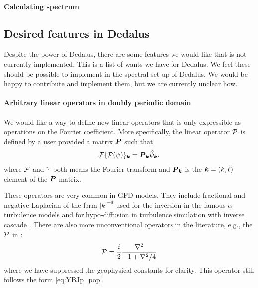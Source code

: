 \paragraph{Calculating spectrum}

\subsection{Desired features in Dedalus}
Despite the power of Dedalus, there are some features we would like that is not currently implemented. This is a list of wants we have for Dedalus. We feel these should be possible to implement in the spectral set-up of Dedalus. We would be happy to contribute and implement them, but we are currently unclear how.

\paragraph{Arbitrary linear operators in doubly periodic domain}\label{sec:ded_want_linop}
We would like a way to define new linear operators that is only expressible as operations on the Fourier coefficient. More specifically, the linear operator $\mathcal{P}$ is defined by a user provided a matrix $\boldsymbol{P}$ such that
\begin{align}
    \mathcal{F}\{\mathcal{P}(\psi)\}_{\boldsymbol{k}} = \boldsymbol{P}_{\boldsymbol{k}}\hat\psi_{\boldsymbol{k}}.
\end{align}
where $\cal{F}$ and $\hat{\cdot}$ both means the Fourier transform and $\boldsymbol{P}_{\boldsymbol{k}}$ is the $\boldsymbol{k}=(k,\ell)$ element of the $\boldsymbol{P}$ matrix.

These operators are very common in GFD models. They include fractional and negative Laplacian of the form $|k|^{-d}$ used for the inversion in the famous $\alpha$-turbulence models \parencite{PierrehumbertEtAl_94,SmithEtAl_02} and for hypo-diffusion in turbulence simulation with inverse cascade \parencite{MajdaEtAl_97,VallgrenLindborg_11,CalliesEtAl_16}. There are also more unconventional operators in the literature, e.g., the $\mathcal{P}$ in \cite[(3.2)]{Xie_20}:
\begin{align}
    \mathcal{P} = \frac{i}{2}\frac{\nabla^2}{-1+\nabla^2/4}\label{eq:YBJp_pop}
\end{align}
where we have suppressed the geophysical constants for clarity. This operator still follows the form \eqref{eq:YBJp_pop}.


